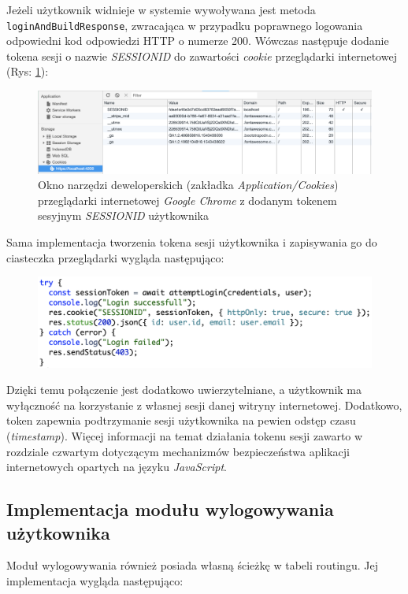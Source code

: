 Jeżeli użytkownik widnieje w systemie wywoływana jest metoda \texttt{loginAndBuildResponse}, zwracająca w przypadku poprawnego logowania odpowiedni kod odpowiedzi HTTP o numerze 200. Wówczas następuje dodanie tokena sesji o nazwie \textit{SESSIONID} do zawartości \textit{cookie} przeglądarki internetowej (Rys: \ref{Rys:cookie_sessionID}):

\begin{figure}[H]
	\centering\includegraphics[scale=0.4]{images/nodejs/cookie_secure.png}
	\caption{Okno narzędzi deweloperskich (zakładka \textit{Application/Cookies}) przeglądarki internetowej \textit{Google Chrome} z dodanym tokenem sesyjnym \textit{SESSIONID} użytkownika}
	\label{Rys:cookie_sessionID}
\end{figure}

Sama implementacja tworzenia tokena sesji użytkownika i zapisywania go do ciasteczka przeglądarki wygląda następująco:

\begin{figure}[H]
	\includegraphics[scale=0.7]{images/code/add_cookie.png}
\end{figure}

Dzięki temu połączenie jest dodatkowo uwierzytelniane, a użytkownik ma wyłączność na korzystanie z własnej sesji danej witryny internetowej. Dodatkowo, token zapewnia podtrzymanie sesji użytkownika na pewien odstęp czasu (\textit{timestamp}). Więcej informacji na temat działania tokenu sesji zawarto w rozdziale czwartym dotyczącym mechanizmów bezpieczeństwa aplikacji internetowych opartych na języku \textit{JavaScript}.

\subsection{Implementacja modułu wylogowywania użytkownika}
Moduł wylogowywania również posiada własną ścieżkę w tabeli routingu. Jej implementacja wygląda następująco:

